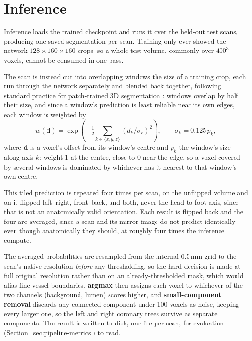 
\section{Inference}
\label{sec:pipeline-inference}

Inference loads the trained checkpoint and runs it over the held-out test scans, producing one
saved segmentation per scan. Training only ever showed the network $128\times160\times160$ crops,
so a whole test volume, commonly over $400^3$ voxels, cannot be consumed in one pass.

The scan is instead cut into overlapping windows the size of a training crop, each run through the
network separately and blended back together, following standard practice for patch-trained 3D
segmentation \cite{isensee2021nnunet}: windows overlap by half their size, and since a window's
prediction is least reliable near its own edges, each window is weighted by
\[
  w(\mathbf{d}) = \exp\!\left(-\tfrac{1}{2}\sum_{k \in \{x,y,z\}} (d_k / \sigma_k)^2\right),
  \qquad \sigma_k = 0.125\,p_k,
\]
where $\mathbf{d}$ is a voxel's offset from its window's centre and $p_k$ the window's size along
axis $k$: weight 1 at the centre, close to 0 near the edge, so a voxel covered by several windows
is dominated by whichever has it nearest to that window's own centre.

This tiled prediction is repeated four times per scan, on the unflipped volume and on it flipped
left--right, front--back, and both, never the head-to-foot axis, since that is not an
anatomically valid orientation. Each result is flipped back and the four are averaged, since a
scan and its mirror image do not predict identically even though anatomically they should, at
roughly four times the inference compute.

The averaged probabilities are resampled from the internal 0.5\,mm grid to the scan's native
resolution \emph{before} any thresholding, so the hard decision is made at full original
resolution rather than on an already-thresholded mask, which would alias fine vessel boundaries.
\textbf{argmax} then assigns each voxel to whichever of the two channels (background, lumen)
scores higher, and \textbf{small-component removal} discards any connected component under 100
voxels as noise, keeping every larger one, so the left and right coronary trees survive as
separate components. The result is written to disk, one file per scan, for evaluation
(Section~\ref{sec:pipeline-metrics}) to read.
